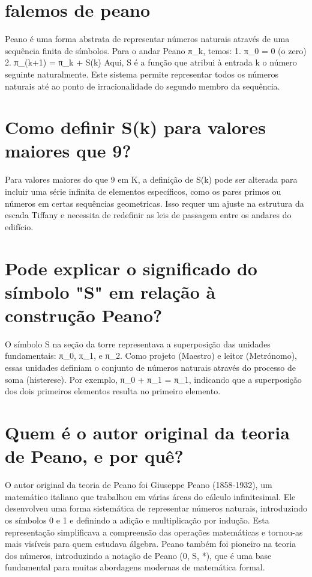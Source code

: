 \documentclass[11pt,a4paper]{article}
\begin{document}
\maketitle
\begin{abstract}Exploração do ollama a partir de sementes banais (nível 1). Teoria continua de fora.\end{abstract}
\section{falemos de peano}
Peano é uma forma abstrata de representar números naturais através de uma sequência finita de símbolos. Para o andar Peano π\_k, temos: 1. π\_0 = 0 (o zero) 2. π\_(k+1) = π\_k + S(k) Aqui, S é a função que atribui à entrada k o número seguinte naturalmente. Este sistema permite representar todos os números naturais até ao ponto de irracionalidade do segundo membro da sequência.

\section{Como definir S(k) para valores maiores que 9?}
Para valores maiores do que 9 em K, a definição de S(k) pode ser alterada para incluir uma série infinita de elementos específicos, como os pares primos ou números em certas sequências geometricas. Isso requer um ajuste na estrutura da escada Tiffany e necessita de redefinir as leis de passagem entre os andares do edifício.

\section{Pode explicar o significado do símbolo "S" em relação à construção Peano?}
O símbolo S na seção da torre representava a superposição das unidades fundamentais: π\_0, π\_1, e π\_2. Como projeto (Maestro) e leitor (Metrónomo), essas unidades definiam o conjunto de números naturais através do processo de soma (histerese). Por exemplo, π\_0 + π\_1 = π\_1, indicando que a superposição dos dois primeiros elementos resulta no primeiro elemento.

\section{Quem é o autor original da teoria de Peano, e por quê?}
O autor original da teoria de Peano foi Giuseppe Peano (1858-1932), um matemático italiano que trabalhou em várias áreas do cálculo infinitesimal. Ele desenvolveu uma forma sistemática de representar números naturais, introduzindo os símbolos 0 e 1 e definindo a adição e multiplicação por indução. Esta representação simplificava a compreensão das operações matemáticas e tornou-as mais visíveis para quem estudava álgebra. Peano também foi pioneiro na teoria dos números, introduzindo a notação de Peano (0, S, *), que é uma base fundamental para muitas abordagens modernas de matemática formal.
\end{document}
